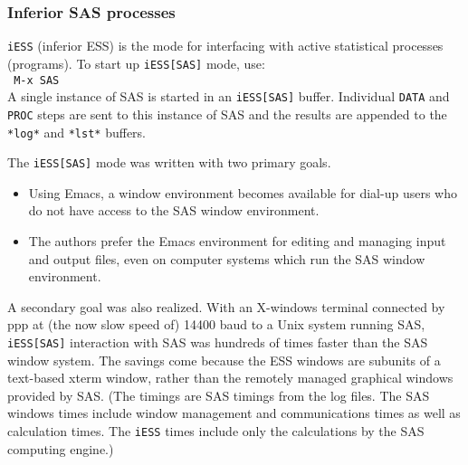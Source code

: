 \documentclass{article}
\newcommand{\stexttt}[1]{{\small\texttt{#1}}}
\newcommand{\elcode}[1]{\\{\stexttt{\hspace*{2em} #1}}\\}
\begin{document}
% 
% 

\subsubsection{Inferior SAS processes}
\label{sec:SAS:proc:inf}

\stexttt{iESS} (inferior ESS) is the mode for interfacing with active
statistical processes (programs).  To start up \stexttt{iESS[SAS]} mode, use:
\elcode{M-x SAS}
A single instance of SAS is started in an \stexttt{iESS[SAS]} buffer.  Individual
\stexttt{DATA} and \stexttt{PROC} steps are sent to this instance of SAS and the results
are appended to the \stexttt{*log*} and \stexttt{*lst*} buffers.

The \stexttt{iESS[SAS]} mode was written with two primary goals.
\begin{itemize}
\item Using Emacs, a window environment becomes available for dial-up
  users who do not have access to the SAS window environment.
\item The authors prefer the Emacs environment for editing and
  managing input and output files, even on computer systems which run
  the SAS window environment.
\end{itemize}
A secondary goal was also realized.  With an X-windows
terminal connected by ppp at (the now slow speed of)
14400 baud to a Unix system running SAS,
\stexttt{iESS[SAS]} interaction with SAS was hundreds of times faster than the
SAS window system.  The savings come because the ESS windows are
subunits of a text-based xterm window, rather than the remotely
managed graphical windows provided by SAS.  (The timings are SAS
timings from the log files.  The SAS windows times include window
management and communications times as well as calculation times.  The
\stexttt{iESS} times include only the calculations by the SAS computing engine.)
\end{document}
